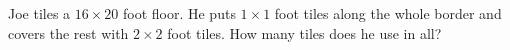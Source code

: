 Joe tiles a $16\times20$ foot floor. He puts $1\times1$ foot tiles along the whole border and covers the rest with $2\times2$ foot tiles. How many tiles does he use in all?
